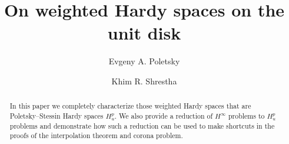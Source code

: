 \documentclass{amsart}
\theoremstyle{remark}
\begin{document}

\title{On weighted Hardy spaces on the unit disk}
\author{Evgeny A. Poletsky}
\address{Department of Mathematics,  Syracuse University,  Carnegie Hall, Syracuse, NY 13244, US\\ Email: eapolets@syr.edu}
\author{Khim R. Shrestha}
\address{Department of Mathematics,  Syracuse University,  Carnegie Hall, Syracuse, NY 13244, US, \\ Email: krshrest@syr.edu}

\maketitle
\begin{abstract}
\par In this paper we completely characterize those weighted Hardy spaces that are Poletsky--Stessin Hardy spaces $H^p_u$. We also provide a reduction of $H^\infty$ problems to $H^p_u$ problems and demonstrate how such a reduction can be used to make shortcuts in the proofs of the interpolation theorem and corona problem.
\end{abstract}
\end{document}
